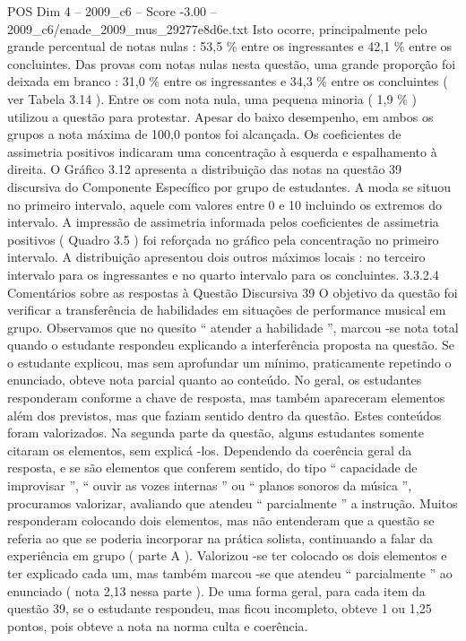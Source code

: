 \begin{textsample}{POS Dim 4 – 2009\_c6 – Score -3.00 – 2009\_c6/enade\_2009\_mus\_29277e8d6e.txt}
Isto ocorre, principalmente pelo grande percentual de notas nulas : 53,5 \% entre os ingressantes e 42,1 \% entre os concluintes.
Das provas com notas nulas nesta questão, uma grande proporção foi deixada em branco : 31,0 \% entre os ingressantes e 34,3 \% entre os concluintes ( ver Tabela 3.14 ).
Entre os com nota nula, uma pequena minoria ( 1,9 \% ) utilizou a questão para protestar.
Apesar do baixo desempenho, em ambos os grupos a nota máxima de 100,0 pontos foi alcançada.
Os coeficientes de assimetria positivos indicaram uma concentração à esquerda e espalhamento à direita.
O Gráfico 3.12 apresenta a distribuição das notas na questão 39 discursiva do Componente Específico por grupo de estudantes.
A moda se situou no primeiro intervalo, aquele com valores entre 0 e 10 incluindo os extremos do intervalo.
A impressão de assimetria informada pelos coeficientes de assimetria positivos ( Quadro 3.5 ) foi reforçada no gráfico pela concentração no primeiro intervalo.
A distribuição apresentou dois outros máximos locais : no terceiro intervalo para os ingressantes e no quarto intervalo para os concluintes. 3.3.2.4 Comentários sobre as respostas à Questão Discursiva 39 O objetivo da questão foi verificar a transferência de habilidades em situações de performance musical em grupo.
Observamos que no quesito “ atender a habilidade ”, marcou -se nota total quando o estudante respondeu explicando a interferência proposta na questão.
Se o estudante explicou, mas sem aprofundar um mínimo, praticamente repetindo o enunciado, obteve nota parcial quanto ao conteúdo.
No geral, os estudantes responderam conforme a chave de resposta, mas também apareceram elementos além dos previstos, mas que faziam sentido dentro da questão.
Estes conteúdos foram valorizados.
Na segunda parte da questão, alguns estudantes somente citaram os elementos, sem explicá -los.
Dependendo da coerência geral da resposta, e se são elementos que conferem sentido, do tipo “ capacidade de improvisar ”, “ ouvir as vozes internas ” ou “ planos sonoros da música ”, procuramos valorizar, avaliando que atendeu “ parcialmente ” a instrução.
Muitos responderam colocando dois elementos, mas não entenderam que a questão se referia ao que se poderia incorporar na prática solista, continuando a falar da experiência em grupo ( parte A ).
Valorizou -se ter colocado os dois elementos e ter explicado cada um, mas também marcou -se que atendeu “ parcialmente ” ao enunciado ( nota 2,13 nessa parte ).
De uma forma geral, para cada item da questão 39, se o estudante respondeu, mas ficou incompleto, obteve 1 ou 1,25 pontos, pois obteve a nota na norma culta e coerência.

\end{textsample}
